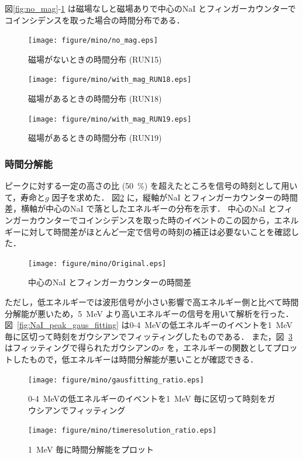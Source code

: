 図\ref{fig:no_mag}-\ref{fig:with_mag_RUN19} は磁場なしと磁場ありで中心のNaI とフィンガーカウンターでコインシデンスを取った場合の時間分布である．
\begin{figure}[H]
\centering
\texttt{[image: figure/mino/no\_mag.eps]}
\caption{磁場がないときの時間分布 (RUN15)}
\label{fig:no_mag}
\begin{minipage}{0.45\hsize}
\centering
\texttt{[image: figure/mino/with\_mag\_RUN18.eps]}
\caption{磁場があるときの時間分布 (RUN18)}
\end{minipage}
\begin{minipage}{0.45\hsize}
\centering
\texttt{[image: figure/mino/with\_mag\_RUN19.eps]}
\caption{磁場があるときの時間分布 (RUN19)}
\label{fig:with_mag_RUN19}
\end{minipage}
\end{figure}


\subsubsection{時間分解能}
ピークに対する一定の高さの比 (50~\%) を超えたところを信号の時刻として用いて，寿命と$g$ 因子を求めた．
図\ref{fig:Original} に，縦軸がNaI とフィンガーカウンターの時間差，横軸が中心のNaI で落としたエネルギーの分布を示す．
中心のNaI とフィンガーカウンターでコインシデンスを取った時のイベントのこの図から，エネルギーに対して時間差がほとんど一定で信号の時刻の補正は必要ないことを確認した．

\begin{figure}[H]%
\centering
\texttt{[image: figure/mino/Original.eps]}
\caption{中心のNaI とフィンガーカウンターの時間差}
\label{fig:Original}
\end{figure}

ただし，低エネルギーでは波形信号が小さい影響で高エネルギー側と比べて時間分解能が悪いため，5~MeV より高いエネルギーの信号を用いて解析を行った．図~\ref{fig:NaI_peak_gaus_fitting} は0-4~MeVの低エネルギーのイベントを1~MeV 毎に区切って時刻をガウシアンでフィッティングしたものである．
また，図~\ref{fig:NaI_peak_time_resolution} はフィッティングで得られたガウシアンの$\sigma$ を，エネルギーの関数としてプロットしたもので，低エネルギーは時間分解能が悪いことが確認できる．

\begin{figure}[H]%
\begin{minipage}{0.5\hsize}
\centering
\texttt{[image: figure/mino/gausfitting\_ratio.eps]}
\caption{0-4~MeVの低エネルギーのイベントを1~MeV 毎に区切って時刻をガウシアンでフィッティング}
\label{fig:NaI_peak_gaus_fitting}
\end{minipage}
\begin{minipage}{0.5\hsize}
\centering
\texttt{[image: figure/mino/timeresolution\_ratio.eps]}
\caption{1~MeV 毎に時間分解能をプロット}
\label{fig:NaI_peak_time_resolution}
\end{minipage}
\end{figure}

